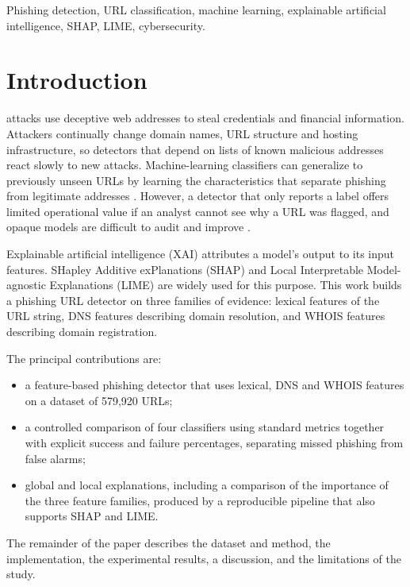 \documentclass[journal]{IEEEtran}
\begin{document}
\begin{IEEEkeywords}
Phishing detection, URL classification, machine learning, explainable artificial intelligence, SHAP, LIME, cybersecurity.
\end{IEEEkeywords}

\IEEEpeerreviewmaketitle

\section{Introduction}
 attacks use deceptive web addresses to steal credentials and financial information. Attackers continually change domain names, URL structure and hosting infrastructure, so detectors that depend on lists of known malicious addresses react slowly to new attacks. Machine-learning classifiers can generalize to previously unseen URLs by learning the characteristics that separate phishing from legitimate addresses \cite{ma2009beyond,sahoo2017malicious}. However, a detector that only reports a label offers limited operational value if an analyst cannot see why a URL was flagged, and opaque models are difficult to audit and improve \cite{arrieta2020xai,adadi2018peeking}.

Explainable artificial intelligence (XAI) attributes a model's output to its input features. SHapley Additive exPlanations (SHAP) \cite{lundberg2017unified} and Local Interpretable Model-agnostic Explanations (LIME) \cite{ribeiro2016why} are widely used for this purpose. This work builds a phishing URL detector on three families of evidence: lexical features of the URL string, DNS features describing domain resolution, and WHOIS features describing domain registration.

The principal contributions are:
\begin{itemize}
\item a feature-based phishing detector that uses lexical, DNS and WHOIS features on a dataset of 579,920 URLs;
\item a controlled comparison of four classifiers using standard metrics together with explicit success and failure percentages, separating missed phishing from false alarms;
\item global and local explanations, including a comparison of the importance of the three feature families, produced by a reproducible pipeline that also supports SHAP and LIME.
\end{itemize}
The remainder of the paper describes the dataset and method, the implementation, the experimental results, a discussion, and the limitations of the study.
\end{document}
